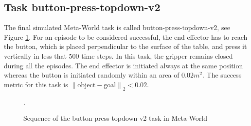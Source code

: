 \subsection{Task button-press-topdown-v2}
\label{subsection:metaworld-button-press-topdown-v2}

The final simulated Meta-World task is called button-press-topdown-v2, see Figure \ref{fig:sequence-button}. For an episode to be considered successful, the end effector has to reach the button, which is placed perpendicular to the surface of the table, and press it vertically in less that 500 time steps.
In this task, the gripper remains closed during all the episodes. The end effector is initiated always at the same position whereas the button is initiated randomly within an area of  $0.02m^2$. The success metric for this task is ${\left\lVert \text{object}-\text{goal} \right\rVert}_2 < 0.02$.

 \begin{figure}[H]
  \centering
  \hspace*{\fill}%
   \hfill
   \hfill
  \hspace*{\fill}%
  \caption{Sequence of the button-press-topdown-v2 task in Meta-World}.
  \label{fig:sequence-button}
\end{figure}





